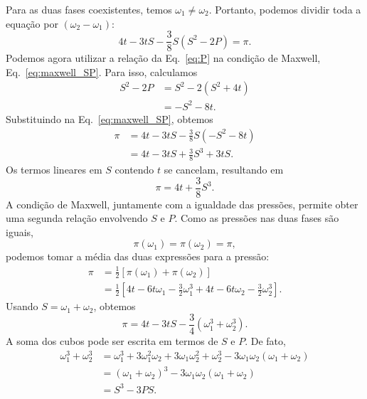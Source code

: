 \documentclass[11pt,a4paper]{article}
\begin{document}
%
Para as duas fases coexistentes, temos $\omega_1\neq\omega_2$.
Portanto, podemos dividir toda a equação por
$(\omega_2-\omega_1)$:
%
\begin{equation}
    4t
    -3tS
    -\frac38S(S^2-2P)
    =
    \pi.
\label{eq:maxwell_SP}
\end{equation}
%
Podemos agora utilizar a relação da Eq.~\eqref{eq:P} na condição de Maxwell,
Eq.~\eqref{eq:maxwell_SP}. Para isso, calculamos
%
\begin{align}
    S^2-2P
    &=
    S^2-2(S^2+4t)
    \nonumber\\
    &=
    -S^2-8t.
\end{align}
%
Substituindo na Eq.~\eqref{eq:maxwell_SP}, obtemos
%
\begin{align}
    \pi
    &=
    4t-3tS
    -\frac38S(-S^2-8t)
    \nonumber\\
    &=
    4t-3tS
    +\frac38S^3
    +3tS.
\end{align}
%
Os termos lineares em $S$ contendo $t$ se cancelam, resultando em
%
\begin{equation}
    \pi
    =
    4t+\frac38S^3.
\label{eq:pi_S}
\end{equation}
%
%
A condição de Maxwell, juntamente com a igualdade das pressões,
permite obter uma segunda relação envolvendo $S$ e $P$. Como as
pressões nas duas fases são iguais,
%
\begin{equation}
    \pi(\omega_1)=\pi(\omega_2)=\pi,
\end{equation}
%
podemos tomar a média das duas expressões para a pressão:
%
\begin{align}
    \pi
    &=
    \frac{1}{2}
    \left[
    \pi(\omega_1)+\pi(\omega_2)
    \right]
    \nonumber\\
    &=
    \frac{1}{2}
    \left[
    4t-6t\omega_1-\frac32\omega_1^3
    +
    4t-6t\omega_2-\frac32\omega_2^3
    \right].
\end{align}
%
Usando $S=\omega_1+\omega_2$, obtemos
%
\begin{equation}
    \pi
    =
    4t-3tS
    -\frac34
    \left(
    \omega_1^3+\omega_2^3
    \right).
\end{equation}
%
A soma dos cubos pode ser escrita em termos de $S$ e $P$.
De fato,
%
\begin{align}
    \omega_1^3+\omega_2^3
    &= \omega_1^3 + 3\omega_1^2\omega_2 + 3\omega_1\omega_2^2 + \omega_2^3 -3\omega_1\omega_2(\omega_1+\omega_2) \\
    &=
    (\omega_1+\omega_2)^3
    -3\omega_1\omega_2(\omega_1+\omega_2)
    \nonumber\\
    &=
    S^3-3PS.
\end{align}
\end{document}

